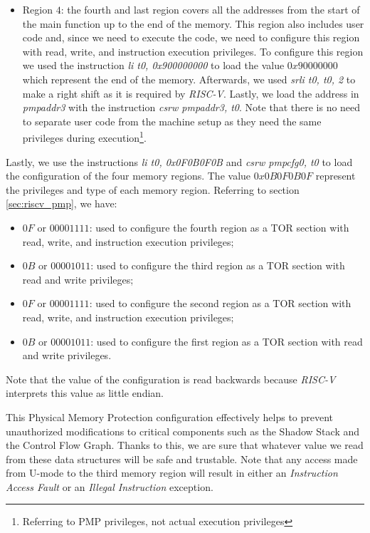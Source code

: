 \begin{itemize}
  \item Region $4$: the fourth and last region covers all the addresses from the
    start of the main function up to the end of the memory. This region also includes
    user code and, since we need to execute the code, we need to configure this region
    with read, write, and instruction execution privileges. To configure this
    region we used the instruction \textit{li t0, 0x900000000} to load the value
    $0x90000000$ which represent the end of the memory. Afterwards, we used \textit{srli
    t0, t0, 2} to make a right shift as it is required by \textit{RISC-V}.
    Lastly, we load the address in \textit{pmpaddr3} with the instruction
    \textit{csrw pmpaddr3, t0}. Note that there is no need to separate user code
    from the machine setup as they need the same privileges during execution\footnote{Referring
    to PMP privileges, not actual execution privileges}.
\end{itemize}

Lastly, we use the instructions \textit{li t0, 0x0F0B0F0B} and \textit{csrw
pmpcfg0, t0} to load the configuration of the four memory regions. The value
$0x0 B0F0B0F$ represent the privileges and type of each memory region. Referring
to section \ref{sec:riscv_pmp}, we have:
\begin{itemize}
  \item $0F$ or $00001111$: used to configure the fourth region as a TOR section
    with read, write, and instruction execution privileges;

  \item $0B$ or $00001011$: used to configure the third region as a TOR section
    with read and write privileges;

  \item $0F$ or $00001111$: used to configure the second region as a TOR section
    with read, write, and instruction execution privileges;

  \item $0B$ or $00001011$: used to configure the first region as a TOR section
    with read and write privileges.
\end{itemize}

Note that the value of the configuration is read backwards because \textit{RISC-V}
interprets this value as little endian.

This Physical Memory Protection configuration effectively helps to prevent unauthorized
modifications to critical components such as the Shadow Stack and the Control Flow
Graph. Thanks to this, we are sure that whatever value we read from these data structures
will be safe and trustable. Note that any access made from U-mode to the third
memory region will result in either an \textit{Instruction Access Fault} or an \textit{Illegal
Instruction} exception.


